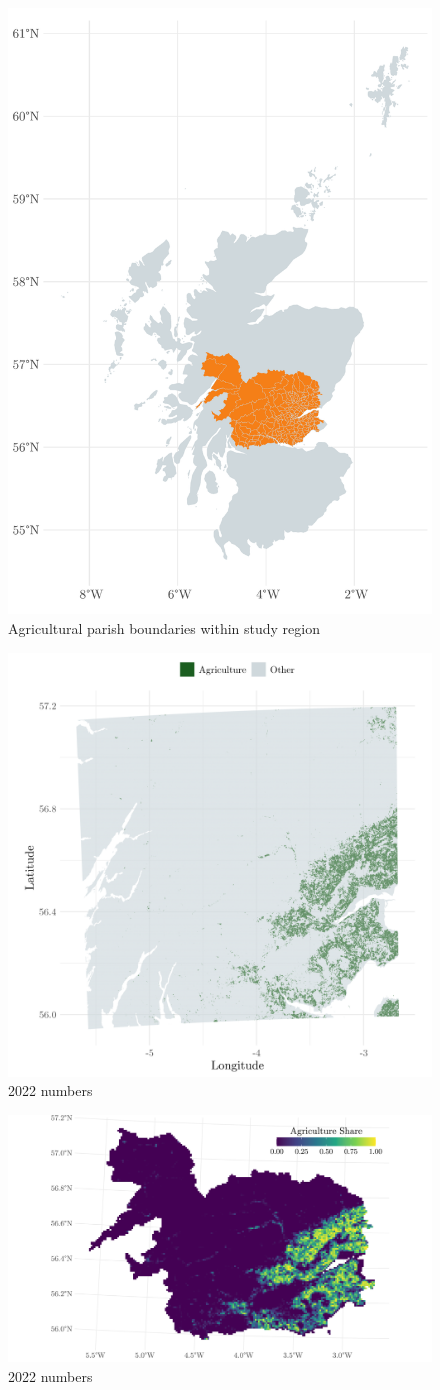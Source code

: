 \begin{figure}
    \centering
    \includegraphics[width=0.6\linewidth]{output/figures/study_area.pdf}
    \caption{Agricultural parish boundaries within study region}
    \label{fig:enter-label}
\end{figure}

\begin{figure}
    \centering
    \includegraphics[width=0.7\linewidth]{output/figures/lcm_in_study_area.png}
    \caption{2022 numbers}
    \label{fig:enter-label}
\end{figure}

\begin{figure}
    \centering
    \includegraphics[width=0.7\linewidth]{output/figures/lcm_agg_river_grid.pdf}
    \caption{2022 numbers}
    \label{fig:lcm-agg}
\end{figure}

